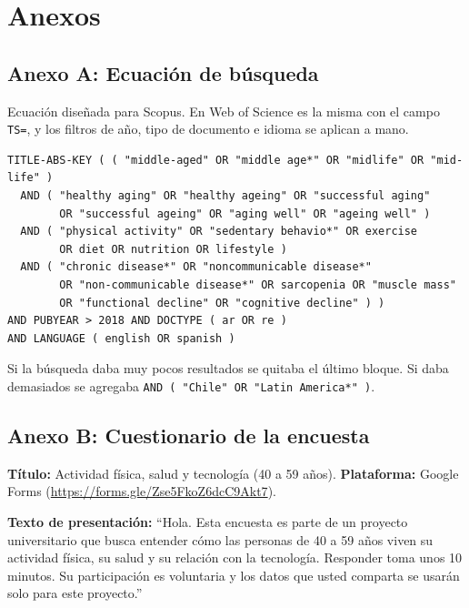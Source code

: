 \documentclass[12pt, letterpaper, table, xcdraw]{extarticle}
\begin{document}
\setcounter{page}{1}
\renewcommand{\thepage}{\hspace*{1em}A\arabic{page}}

{}
\section*{Anexos}

{}
\subsection*{Anexo A: Ecuación de búsqueda}

Ecuación diseñada para Scopus. En Web of Science es la misma con el campo \texttt{TS=}, y los filtros de año, tipo de documento e idioma se aplican a mano.

{\footnotesize
\begin{verbatim}
TITLE-ABS-KEY ( ( "middle-aged" OR "middle age*" OR "midlife" OR "mid-life" )
  AND ( "healthy aging" OR "healthy ageing" OR "successful aging"
        OR "successful ageing" OR "aging well" OR "ageing well" )
  AND ( "physical activity" OR "sedentary behavio*" OR exercise
        OR diet OR nutrition OR lifestyle )
  AND ( "chronic disease*" OR "noncommunicable disease*"
        OR "non-communicable disease*" OR sarcopenia OR "muscle mass"
        OR "functional decline" OR "cognitive decline" ) )
AND PUBYEAR > 2018 AND DOCTYPE ( ar OR re )
AND LANGUAGE ( english OR spanish )
\end{verbatim}
}

Si la búsqueda daba muy pocos resultados se quitaba el último bloque. Si daba demasiados se agregaba \verb|AND ( "Chile" OR "Latin America*" )|.

{}
\subsection*{Anexo B: Cuestionario de la encuesta}

\textbf{Título:} Actividad física, salud y tecnología (40 a 59 años). \textbf{Plataforma:} Google Forms (\url{https://forms.gle/Zse5FkoZ6dcC9Akt7}).

\textbf{Texto de presentación:} ``Hola. Esta encuesta es parte de un proyecto universitario que busca entender cómo las personas de 40 a 59 años viven su actividad física, su salud y su relación con la tecnología. Responder toma unos 10 minutos. Su participación es voluntaria y los datos que usted comparta se usarán solo para este proyecto.''
\end{document}
